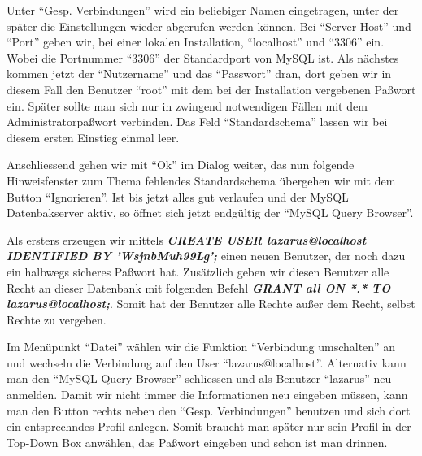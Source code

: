 Unter "`Gesp. Verbindungen"' wird ein beliebiger Namen eingetragen, unter der später die Einstellungen wieder abgerufen werden können. Bei "`Server Host"' und "`Port"' geben wir, bei einer lokalen Installation, "`localhost"' und "`3306"' ein. Wobei die Portnummer "`3306"' der Standardport von MySQL ist. Als nächstes kommen jetzt der "`Nutzername"' und das "`Passwort"' dran, dort geben wir in diesem Fall den Benutzer "`root"' mit dem bei der Installation vergebenen Paßwort ein. Später sollte man sich nur in zwingend notwendigen Fällen mit dem Administratorpaßwort verbinden. Das Feld "`Standardschema"' lassen wir bei diesem ersten Einstieg einmal leer.
\label{fig:NewDB02}

Anschliessend gehen wir mit "`Ok"' im Dialog weiter, das nun folgende Hinweisfenster zum Thema fehlendes Standardschema übergehen wir mit dem Button "`Ignorieren"'. Ist bis jetzt alles gut verlaufen und der MySQL Datenbakserver aktiv, so öffnet sich jetzt endgültig der "`MySQL Query Browser"'.

\label{fig:NewDB03}
Als ersters erzeugen wir mittels \textbf{\emph{CREATE USER lazarus@localhost IDENTIFIED BY 'WsjnbMuh99Lg';}} einen neuen Benutzer, der noch dazu ein halbwegs sicheres Paßwort hat. Zusätzlich geben wir diesen Benutzer alle Recht an dieser Datenbank mit folgenden Befehl \textbf{\emph{GRANT all ON *.* TO lazarus@localhost;}}. Somit hat der Benutzer alle Rechte außer dem Recht, selbst Rechte zu vergeben.

Im Menüpunkt "`Datei"' wählen wir die Funktion "`Verbindung umschalten"' an und wechseln die Verbindung auf den User "`lazarus@localhost"'. Alternativ kann man den "`MySQL Query Browser"'  schliessen und als Benutzer "`lazarus"' neu anmelden. Damit wir nicht immer die Informationen neu eingeben müssen, kann man den Button rechts neben den "`Gesp. Verbindungen"' benutzen und sich dort ein entsprechndes Profil anlegen. Somit braucht man später nur sein Profil in der Top-Down Box anwählen, das Paßwort eingeben und schon ist man drinnen. 

